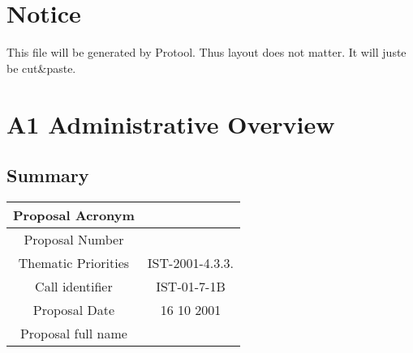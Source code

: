 \documentclass[a4paper,11pt]{report}
\begin{document}
\section*{Notice}
This file will be generated by Protool. Thus layout does not matter. It will
juste be cut\&paste.
\section*{A1 Administrative Overview}
\subsection*{Summary}
\begin{tabular}{|c|c|}
\hline
Proposal Acronym &  \\ \hline
Proposal Number &  \\ \hline
Thematic Priorities & IST-2001-4.3.3. \\ \hline
Call identifier & IST-01-7-1B\\ \hline
Proposal Date & 16 10 2001 \\ \hline
Proposal full name & \\ \hline
\end{tabular}
\end{document}
